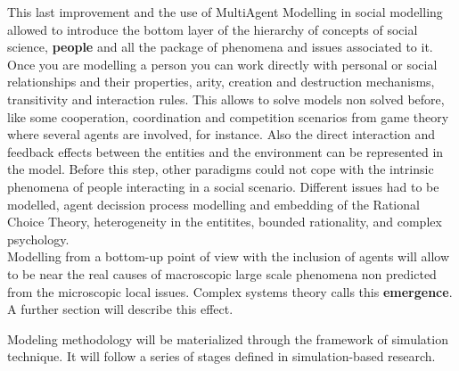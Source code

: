 \documentclass{report}
\begin{document}
This last improvement and the use of MultiAgent Modelling in social modelling allowed to introduce the bottom layer of the hierarchy of concepts of social science, \textbf{people} and all the package of phenomena and issues associated to it. Once you are modelling a person you can work directly with personal or social relationships and their properties, arity, creation and destruction mechanisms, transitivity and interaction rules. This allows to solve models non solved before, like some cooperation, coordination and competition scenarios from game theory where several agents are involved, for instance. Also the direct interaction and feedback effects between the entities and the  environment can be represented in the model. Before this step, other paradigms could not cope with the intrinsic phenomena of people interacting in a social scenario. Different issues had to be modelled, agent decission process modelling and embedding of the Rational Choice Theory, heterogeneity in the entitites, bounded rationality, and complex psychology.\\ 
Modelling from a bottom-up point of view with the inclusion of agents will allow to be near the real causes of macroscopic large scale phenomena non predicted from the microscopic local issues. Complex systems theory calls this \textbf{emergence}.
A further section will describe this effect.

 

Modeling methodology will be materialized through the framework of simulation technique. It will follow a series
of stages defined in simulation-based research. 
\end{document}

